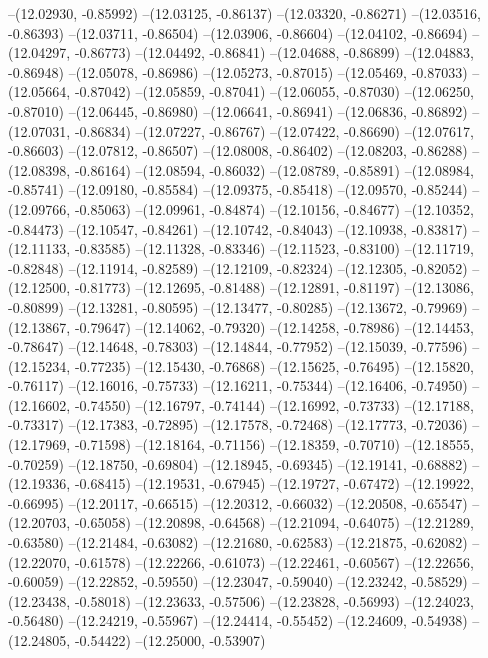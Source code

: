 --(12.02930, -0.85992)
--(12.03125, -0.86137)
--(12.03320, -0.86271)
--(12.03516, -0.86393)
--(12.03711, -0.86504)
--(12.03906, -0.86604)
--(12.04102, -0.86694)
--(12.04297, -0.86773)
--(12.04492, -0.86841)
--(12.04688, -0.86899)
--(12.04883, -0.86948)
--(12.05078, -0.86986)
--(12.05273, -0.87015)
--(12.05469, -0.87033)
--(12.05664, -0.87042)
--(12.05859, -0.87041)
--(12.06055, -0.87030)
--(12.06250, -0.87010)
--(12.06445, -0.86980)
--(12.06641, -0.86941)
--(12.06836, -0.86892)
--(12.07031, -0.86834)
--(12.07227, -0.86767)
--(12.07422, -0.86690)
--(12.07617, -0.86603)
--(12.07812, -0.86507)
--(12.08008, -0.86402)
--(12.08203, -0.86288)
--(12.08398, -0.86164)
--(12.08594, -0.86032)
--(12.08789, -0.85891)
--(12.08984, -0.85741)
--(12.09180, -0.85584)
--(12.09375, -0.85418)
--(12.09570, -0.85244)
--(12.09766, -0.85063)
--(12.09961, -0.84874)
--(12.10156, -0.84677)
--(12.10352, -0.84473)
--(12.10547, -0.84261)
--(12.10742, -0.84043)
--(12.10938, -0.83817)
--(12.11133, -0.83585)
--(12.11328, -0.83346)
--(12.11523, -0.83100)
--(12.11719, -0.82848)
--(12.11914, -0.82589)
--(12.12109, -0.82324)
--(12.12305, -0.82052)
--(12.12500, -0.81773)
--(12.12695, -0.81488)
--(12.12891, -0.81197)
--(12.13086, -0.80899)
--(12.13281, -0.80595)
--(12.13477, -0.80285)
--(12.13672, -0.79969)
--(12.13867, -0.79647)
--(12.14062, -0.79320)
--(12.14258, -0.78986)
--(12.14453, -0.78647)
--(12.14648, -0.78303)
--(12.14844, -0.77952)
--(12.15039, -0.77596)
--(12.15234, -0.77235)
--(12.15430, -0.76868)
--(12.15625, -0.76495)
--(12.15820, -0.76117)
--(12.16016, -0.75733)
--(12.16211, -0.75344)
--(12.16406, -0.74950)
--(12.16602, -0.74550)
--(12.16797, -0.74144)
--(12.16992, -0.73733)
--(12.17188, -0.73317)
--(12.17383, -0.72895)
--(12.17578, -0.72468)
--(12.17773, -0.72036)
--(12.17969, -0.71598)
--(12.18164, -0.71156)
--(12.18359, -0.70710)
--(12.18555, -0.70259)
--(12.18750, -0.69804)
--(12.18945, -0.69345)
--(12.19141, -0.68882)
--(12.19336, -0.68415)
--(12.19531, -0.67945)
--(12.19727, -0.67472)
--(12.19922, -0.66995)
--(12.20117, -0.66515)
--(12.20312, -0.66032)
--(12.20508, -0.65547)
--(12.20703, -0.65058)
--(12.20898, -0.64568)
--(12.21094, -0.64075)
--(12.21289, -0.63580)
--(12.21484, -0.63082)
--(12.21680, -0.62583)
--(12.21875, -0.62082)
--(12.22070, -0.61578)
--(12.22266, -0.61073)
--(12.22461, -0.60567)
--(12.22656, -0.60059)
--(12.22852, -0.59550)
--(12.23047, -0.59040)
--(12.23242, -0.58529)
--(12.23438, -0.58018)
--(12.23633, -0.57506)
--(12.23828, -0.56993)
--(12.24023, -0.56480)
--(12.24219, -0.55967)
--(12.24414, -0.55452)
--(12.24609, -0.54938)
--(12.24805, -0.54422)
--(12.25000, -0.53907)
